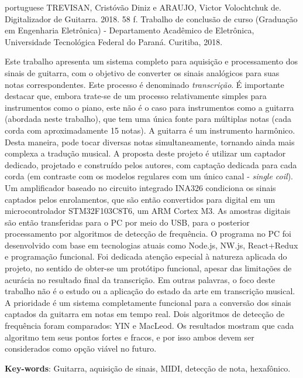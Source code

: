 \begin{summary}[Resumo]
	\begin{otherlanguage*}{portuguese}
		TREVISAN, Cristóvão Diniz e ARAUJO, Victor Volochtchuk de. Digitalizador de Guitarra.
		2018. 58 f. Trabalho de conclusão de curso (Graduação em Engenharia Eletrônica) -
		Departamento Acadêmico de Eletrônica, Universidade Tecnológica Federal do Paraná.
		Curitiba, 2018.


		Este trabalho apresenta um sistema completo para aquisição e processamento dos sinais de guitarra,
		com o objetivo de converter os sinais analógicos para suas notas correspondentes. Este processo é denominado \emph{transcrição}.
		É importante destacar que, embora trate-se de um processo relativamente simples para instrumentos
		como o piano, este não é o caso para instrumentos como a guitarra (abordada neste trabalho), que tem
		uma única fonte para múltiplas notas (cada corda com aproximadamente 15 notas). A guitarra é um instrumento
		harmônico. Desta maneira, pode tocar diversas notas simultaneamente, tornando ainda mais complexa a tradução
		musical. A proposta deste projeto é utilizar um captador dedicado, projetado e construído pelos autores,
		com captação dedicada para cada corda (em contraste com os modelos regulares com um único canal - \emph{single coil}).
		Um amplificador baseado no circuito integrado INA326 condiciona os sinais captados pelos enrolamentos, que são
		então convertidos para digital em um microcontrolador STM32F103C8T6,
		um ARM Cortex M3. As amostras digitais são então transferidas para o PC por meio do USB, para o posterior processamento
		por algoritmos de detecção de frequência.  O programa no PC foi desenvolvido com base em tecnologias atuais como Node.js, NW.js, React+Redux e
		programação funcional. Foi dedicada atenção especial à natureza aplicada do projeto, no sentido de obter-se
		um protótipo funcional, apesar das limitações de acurácia no resultado final da transcrição. Em outras palavras,
		o foco deste trabalho não é o estudo ou a aplicação do estado da arte em transcrição musical. A prioridade é um sistema completamente funcional
		para a conversão dos sinais captados da guitarra em notas em tempo real. Dois algoritmos de detecção
		de frequência foram comparados: YIN e MacLeod. Os resultados mostram que cada algoritmo tem seus pontos
		fortes e fracos, e por isso ambos devem ser considerados como opção viável no futuro.


		\textbf{Key-words}: Guitarra, aquisição de sinais, MIDI, detecção de nota, hexafônico.
	\end{otherlanguage*}
\end{summary}

